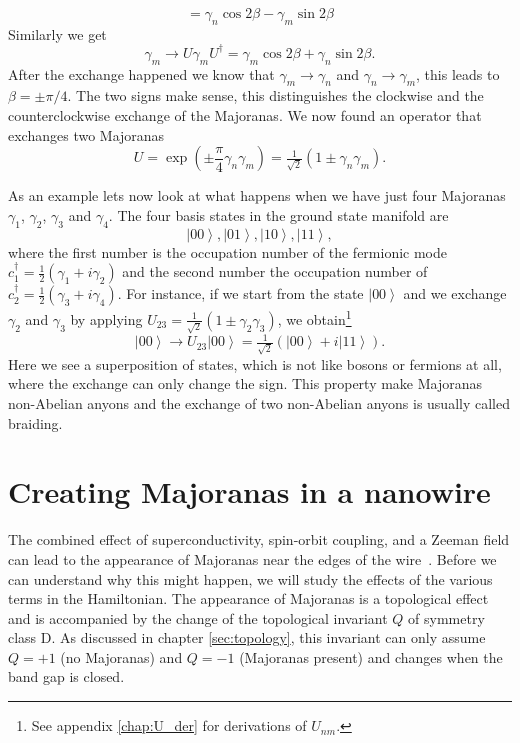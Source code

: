 \[
=\gamma_{n}\cos2\beta-\gamma_{m}\sin2\beta
\]
Similarly we get
\[
\gamma_{m}\to U\gamma_{m}U^{\dagger}=\gamma_{m}\cos2\beta+\gamma_{n}\sin2\beta.
\]
After the exchange happened we know that $\gamma_{m}\to\gamma_{n}$ and $\gamma_{n}\to\gamma_{m}$, this leads to $\beta=\pm\pi/4$.
The two signs make sense, this distinguishes the clockwise and the counterclockwise exchange of the Majoranas.
We now found an operator that exchanges two Majoranas
\begin{equation}
U=\exp\left(\pm\frac{\pi}{4}\gamma_{n}\gamma_{m}\right)=\tfrac{1}{\sqrt{2}}\left(1\pm\gamma_{n}\gamma_{m}\right).\label{eq:U_nm}
\end{equation}

As an example lets now look at what happens when we have just four Majoranas $\gamma_{1}$, $\gamma_{2}$, $\gamma_{3}$ and $\gamma_{4}$.
The four basis states in the ground state manifold are
\begin{equation}
\left|00\right\rangle ,\left|01\right\rangle ,\left|10\right\rangle ,\left|11\right\rangle ,\label{eq:basis}
\end{equation}
where the first number is the occupation number of the fermionic mode $c_{1}^{\dagger}=\tfrac{1}{2}(\gamma_{1}+i\gamma_{2})$ and the second number the occupation number of $c_{2}^{\dagger}=\tfrac{1}{2}(\gamma_{3}+i\gamma_{4})$.
For instance, if we start from the state $\left|00\right\rangle $ and we exchange $\gamma_{2}$ and $\gamma_{3}$ by applying $U_{23}=\tfrac{1}{\sqrt{2}}\left(1\pm\gamma_{2}\gamma_{3}\right)$, we obtain\footnote{See appendix \ref{chap:U_der} for derivations of $U_{nm}$.}
\[
\left|00\right\rangle \to U_{23}\left|00\right\rangle =\tfrac{1}{\sqrt{2}}\left(\left|00\right\rangle +i\left|11\right\rangle \right).
\]
Here we see a superposition of states, which is not like bosons or fermions at all, where the exchange can only change the sign.
This property make Majoranas non-Abelian anyons and the exchange of two non-Abelian anyons is usually called braiding.



\section{\label{sec:MBS}Creating Majoranas in a nanowire}

The combined effect of superconductivity, spin-orbit coupling, and a Zeeman field can lead to the appearance of Majoranas near the edges of the wire~\cite{Lutchyn2010,Oreg2010}.
Before we can understand why this might happen, we will study the effects of the various terms in the Hamiltonian.
The appearance of Majoranas is a topological effect and is accompanied by the change of the topological invariant $Q$ of symmetry class D.
As discussed in chapter \ref{sec:topology}, this invariant can only assume $Q=+1$ (no Majoranas) and $Q=-1$ (Majoranas present) and changes when the band gap is closed.



